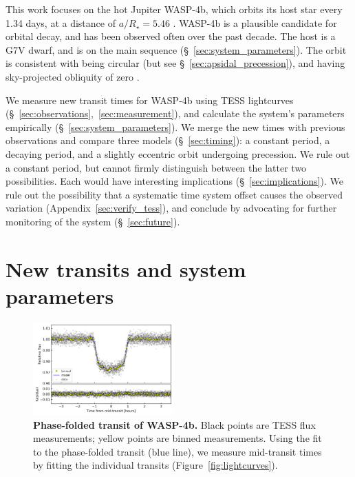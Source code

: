 \documentclass[12pt,twocolumn,tighten]{aastex62}
\begin{document}
This work focuses on the hot Jupiter WASP-4b, which orbits its host
star every 1.34 days, at a distance of $a/R_\star = 5.46$
\citep{wilson_wasp-4b_2008,hoyer_tramos_2013}.  WASP-4b is a plausible
candidate for orbital decay, and has been
observed often over the past decade.  The host is a G7V dwarf, and is on the
main sequence (\S~\ref{sec:system_parameters}).  The orbit is
consistent with being circular (but see
\S~\ref{sec:apsidal_precession}), and having sky-projected obliquity
of zero
\citep{triaud_spin-orbit_2010,beerer_secondary_2011,sanchis-ojeda_starspots_2011}.

We measure new transit times for WASP-4b using TESS lightcurves
(\S~\ref{sec:observations},~\ref{sec:measurement}), and calculate the
system's parameters empirically (\S~\ref{sec:system_parameters}).  We
merge the new times with previous observations and compare three
models (\S~\ref{sec:timing}): a constant period, a decaying period,
and a slightly eccentric orbit undergoing precession.  We rule out a
constant period, but cannot firmly distinguish between the latter two
possibilities.  Each would have interesting implications
(\S~\ref{sec:implications}).  We rule out the possibility that a
systematic time system offset causes the observed variation
(Appendix~\ref{sec:verify_tess}), and conclude by advocating for
further monitoring of the system (\S~\ref{sec:future}).



\section{New transits and system parameters}

\begin{figure}[t]
    \begin{center}
        \includegraphics[width=0.48\textwidth]{f1.png}
    \end{center}
    \vspace{-0.5cm}
    \caption{
        {\bf Phase-folded transit of WASP-4b.} Black points are TESS
        flux measurements; yellow points are binned measurements.
        Using the fit to the phase-folded transit (blue line), we
        measure mid-transit times by fitting the individual transits
        (Figure~\ref{fig:lightcurves}).
        \label{fig:phasefold}
    }
\end{figure}
\end{document}
